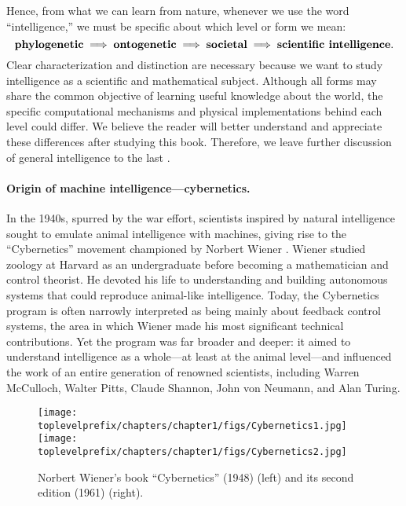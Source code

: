 \documentclass[../../book-main.tex]{subfiles}
\begin{document}
Hence, from what we can learn from nature, whenever we use the word ``intelligence,'' we must be specific about which level or form we mean:
\begin{equation}
    \text{\textbf{phylogenetic}} \;
   \Longrightarrow \; \text{\textbf{ontogenetic}} \; \Longrightarrow \; 
   \text{\textbf{societal}}
   \; \Longrightarrow \; 
   \text{\textbf{scientific intelligence}}.
\end{equation}
Clear characterization and distinction are necessary because we want to study intelligence as a scientific and mathematical subject. Although all forms may share the common objective of learning useful knowledge about the world, the specific computational mechanisms and physical implementations behind each level could differ. We believe the reader will better understand and appreciate these differences after studying this book. Therefore, we leave further discussion of general intelligence to the last .

\paragraph{Origin of machine intelligence---cybernetics.}
In the 1940s, spurred by the war effort, scientists inspired by natural intelligence sought to emulate animal intelligence with machines, giving rise to the ``Cybernetics'' movement championed by Norbert Wiener \cite{Kline-2011}. Wiener studied zoology at Harvard as an undergraduate before becoming a mathematician and control theorist. He devoted his life to understanding and building autonomous systems that could reproduce animal-like intelligence. Today, the Cybernetics program is often narrowly interpreted as being mainly about feedback control systems, the area in which Wiener made his most significant technical contributions. Yet the program was far broader and deeper: it aimed to understand intelligence as a whole---at least at the animal level---and influenced the work of an entire generation of renowned scientists, including Warren McCulloch, Walter Pitts, Claude Shannon, John von Neumann, and Alan Turing.

\begin{figure}
    \centering
    \texttt{[image: \\toplevelprefix/chapters/chapter1/figs/Cybernetics1.jpg]}
    \hspace{10mm} \texttt{[image: \\toplevelprefix/chapters/chapter1/figs/Cybernetics2.jpg]}
    \caption{Norbert Wiener's book ``Cybernetics'' (1948) \cite{Wiener-Cybernetics-1948} (left) and its second edition (1961) \cite{Wiener-Cybernetics-1961} (right).}
    \label{fig:cybernetcis}
\end{figure}
\end{document}
